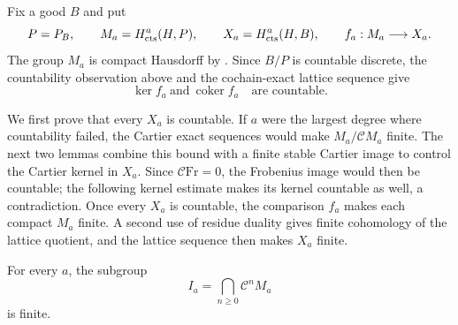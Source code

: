 Fix a good $B$ and put
\[
 P=P_B,\qquad M_a=H^a_{\mathrm{cts}}(H,P),\qquad
 X_a=H^a_{\mathrm{cts}}(H,B),\qquad f_a:M_a\longrightarrow X_a.
\]
The group $M_a$ is compact Hausdorff by
.  Since $B/P$ is countable discrete, the
countability observation above and the cochain-exact lattice sequence
give
\begin{equation}\label{h3:co:countable-kernel-cokernel}
 \ker f_a\ \text{and}\ \operatorname{coker}f_a
 \quad\text{are countable.}
\end{equation}

We first prove that every $X_a$ is countable.  If $a$ were the largest
degree where countability failed, the Cartier exact sequences would make
$M_a/\mathcal C M_a$ finite.  The next two lemmas combine this bound with
a finite stable Cartier image to control the Cartier kernel in $X_a$.
Since $\mathcal C\mathrm{Fr}=0$, the Frobenius image would then be
countable; the following kernel estimate makes its kernel countable as
well, a contradiction.  Once every $X_a$ is countable, the comparison
$f_a$ makes each compact $M_a$ finite.  A second use of residue duality
gives finite cohomology of the lattice quotient, and the lattice sequence
then makes $X_a$ finite.

\begin{lemma}\label{h3:co:stable-image}
For every $a$, the subgroup
\[
 I_a=\bigcap_{n\geq0}\mathcal C^nM_a
\]
is finite.
\end{lemma}

